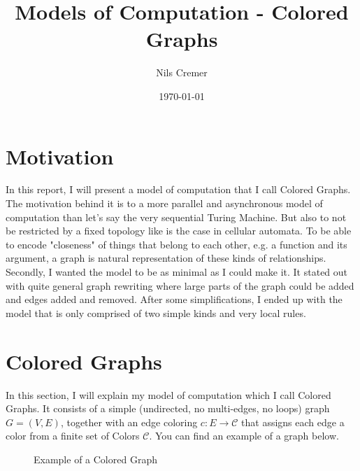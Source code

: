 \documentclass{article}
\title{Models of Computation - Colored Graphs}
\author{Nils Cremer}
\date{\today}
\newcommand{\C}{\mathcal{C}}
\begin{document}
\maketitle

\section{Motivation}

In this report, I will present a model of computation that I call Colored Graphs.
The motivation behind it is to a more parallel and asynchronous model of computation than let's say the very sequential Turing Machine.
But also to not be restricted by a fixed topology like is the case in cellular automata.
To be able to encode "closeness" of things that belong to each other, e.g. a function and its argument, a graph is natural representation of these kinds of relationships.
Secondly, I wanted the model to be as minimal as I could make it.
It stated out with quite general graph rewriting where large parts of the graph could be added and edges added and removed.
After some simplifications, I ended up with the model that is only comprised of two simple kinds and very local rules.

\section{Colored Graphs}

In this section, I will explain my model of computation which I call Colored Graphs.
It consists of a simple (undirected, no multi-edges, no loops) graph $G = (V, E)$,
together with an edge coloring $c : E \to \C$ that assigns each edge a color from a finite set of Colors $\C$.
You can find an example of a graph below.

\begin{figure}[H]
    \label{fig:graph1}
    \centering
    \caption{Example of a Colored Graph}
\end{figure}
\end{document}
